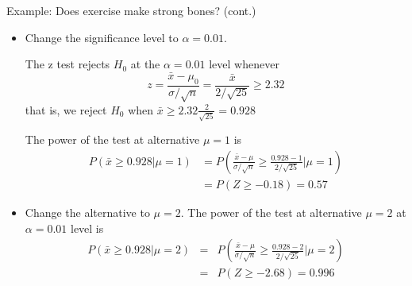\documentclass{beamer}\usepackage[]{graphicx}\usepackage[]{color}
\begin{document}
\begin{frame}{Example: Does exercise make strong bones? (cont.)}

\begin{small}
    \begin{itemize}

    \item Change the significance level to $\alpha =0.01 $. \pause

      The z test rejects $H_0$ at the $\alpha =0.01$ level whenever
      \[ z = \frac{ \bar{x} - \mu_0}{\sigma/\sqrt{n}}
      =\frac{\bar{x}}{2/\sqrt{25}}\geq 2.32 \] that is, we reject
      $H_0$ when $\bar{x} \geq 2.32 \frac{2}{\sqrt{25}} = 0.928$ \pause

      The power of the test at alternative $\mu= 1 $ is
      \begin{align*}
        P( \bar{x} \geq 0.928 | \mu = 1)
        &= P(\frac{\bar{x} - \mu}{\sigma/\sqrt{n}} \geq
        \frac{0.928 -1}{2/\sqrt{25}} | \mu=1)\\
        &= P(Z \geq -0.18)= 0.57
      \end{align*} \pause

    \item Change the alternative to $\mu=2$. \pause  The power of the test at alternative $\mu= 2 $ at $\alpha
      =0.01$ level is
      \begin{eqnarray*}
        P( \bar{x} \geq 0.928 | \mu = 2)
        &=& P(\frac{\bar{x} - \mu}{\sigma/\sqrt{n}} \geq
        \frac{0.928 -2}{2/\sqrt{25}} | \mu =2)\\
        &=& P(Z \geq -2.68)=0.996
      \end{eqnarray*}
      
      \end{itemize}
      \end{small}
\end{frame}
\end{document}
